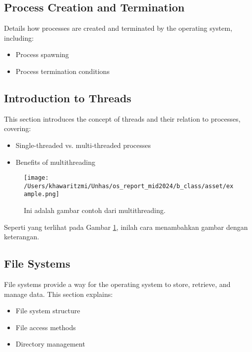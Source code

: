 \documentclass[12pt]{article}
\begin{document}
\subsection{Process Creation and Termination}
Details how processes are created and terminated by the operating system, including:
\begin{itemize}
    \item Process spawning
    \item Process termination conditions
\end{itemize}

\subsection{Introduction to Threads}
This section introduces the concept of threads and their relation to processes, covering:
\begin{itemize}
    \item Single-threaded vs. multi-threaded processes
    \item Benefits of multithreading
\end{itemize}

\begin{figure}[h]
    \centering
    \texttt{[image: /Users/khawaritzmi/Unhas/os\_report\_mid2024/b\_class/asset/example.png]}  %
    \caption{Ini adalah gambar contoh dari multithreading.}
    \label{fig:contoh_gambar}
\end{figure}

Seperti yang terlihat pada Gambar \ref{fig:contoh_gambar}, inilah cara menambahkan gambar dengan keterangan.

\subsection{File Systems}
File systems provide a way for the operating system to store, retrieve, and manage data. This section explains:
\begin{itemize}
    \item File system structure
    \item File access methods
    \item Directory management
\end{itemize}
\end{document}
